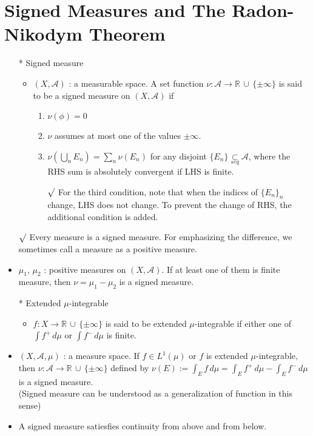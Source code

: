 \documentclass[12pt]{article}
\newcommand{\rmk}{$\surd$}
\newcommand{\R}{\mathbb{R}}
\newcommand{\A}{\mathcal{A}}
\newcommand{\seq}{\underset{seq}{\subset}}
\newcommand{\union}{\,\cup\,}
\begin{document}
\section{Signed Measures and The Radon-Nikodym Theorem}
\begin{itemize}
    \item[*] Signed measure
    \begin{itemize}
        \item $(X,\A)$ : a measurable space. A set function $\nu: \A\rightarrow \R\union \{\pm \infty\}$ is said to be a signed measure on $(X, \A)$ if \begin{enumerate}
            \item $\nu(\phi)=0$
            \item $\nu$ assumes at most one of the values $\pm \infty$.
            \item $\nu(\bigcup_{n}E_n)=\sum_n \nu(E_n)$ for any disjoint $\{E_n\}\seq \A$, where the RHS sum is absolutely convergent if LHS is finite.
            \item[\rmk] For the third condition, note that when the indices of $\{E_n\}_n$ change, LHS does not change. To prevent the change of RHS, the additional condition is added.
        \end{enumerate}
    \end{itemize}
    \item[\rmk] Every measure is a signed measure. For emphasizing the difference, we sometimes call a measure as a positive measure.
    \item $\mu_1,\, \mu_2$ : positive measures on $(X, \A)$. If at least one of them is finite measure, then $\nu=\mu_1-\mu_2$ is a signed measure. 
    \item[*] Extended $\mu$-integrable
    \begin{itemize}
        \item $f:X\rightarrow \R\union \{\pm \infty\}$ is said to be extended $\mu$-integrable if either one of $\int f^+\, d\mu$ or $\int f^-\, d\mu$ is finite. 
    \end{itemize}
    \item $(X, \A, \mu)$ : a measure space. If $f\in L^1(\mu)$ or $f$ is extended $\mu$-integrable, then $\nu : \A\rightarrow \R\union \{\pm \infty\}$ defined by $\nu(E):=\int_E f\, d\mu=\int_E f^+\, d\mu-\int_E f^-\,d\mu$ is a signed measure. \\(Signed measure can be understood as a generalization of function in this sense)
    \item A signed measure satiesfies continuity from above and from below.

\end{itemize}
\end{document}
